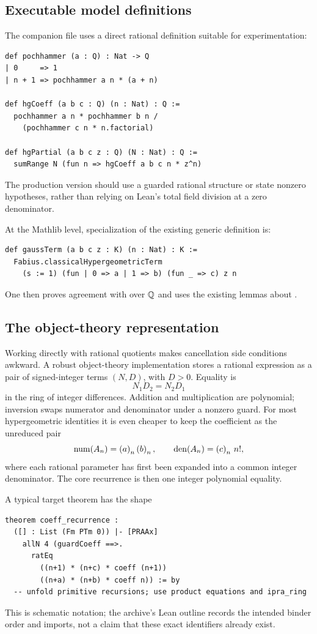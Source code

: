 \subsection{Executable model definitions}

The companion file  uses a direct
rational definition suitable for experimentation:
\begin{lstlisting}[language={}]
def pochhammer (a : Q) : Nat -> Q
| 0     => 1
| n + 1 => pochhammer a n * (a + n)

def hgCoeff (a b c : Q) (n : Nat) : Q :=
  pochhammer a n * pochhammer b n /
    (pochhammer c n * n.factorial)

def hgPartial (a b c z : Q) (N : Nat) : Q :=
  sumRange N (fun n => hgCoeff a b c n * z^n)
\end{lstlisting}
The production version should use a guarded rational structure or state
nonzero hypotheses, rather than relying on Lean's total field division at a
zero denominator.

At the Mathlib level, specialization of the existing generic definition is:
\begin{lstlisting}[language={}]
def gaussTerm (a b c z : K) (n : Nat) : K :=
  Fabius.classicalHypergeometricTerm
    (s := 1) (fun | 0 => a | 1 => b) (fun _ => c) z n
\end{lstlisting}
One then proves agreement with  over \(\mathbb Q\) and uses the
existing lemmas about .

\subsection{The object-theory representation}

Working directly with rational quotients makes cancellation side conditions
awkward.  A robust object-theory implementation stores a rational expression
as a pair of signed-integer terms \((N,D)\), with \(D>0\).  Equality is
\[
  N_1D_2=N_2D_1
\]
in the ring of integer differences.  Addition and multiplication are
polynomial; inversion swaps numerator and denominator under a nonzero guard.
For most hypergeometric identities it is even cheaper to keep the coefficient
as the unreduced pair
\[
 \operatorname{num}(A_n)=\left(a\right)_{n}\left(b\right)_{n},
 \qquad
 \operatorname{den}(A_n)=\left(c\right)_{n}\,n!,
\]
where each rational parameter has first been expanded into a common integer
denominator.  The core recurrence is then one integer polynomial equality.

A typical target theorem has the shape
\begin{lstlisting}[language={}]
theorem coeff_recurrence :
  ([] : List (Fm PTm 0)) |- [PRAAx]
    allN 4 (guardCoeff ==>.
      ratEq
        ((n+1) * (n+c) * coeff (n+1))
        ((n+a) * (n+b) * coeff n)) := by
  -- unfold primitive recursions; use product equations and ipra_ring
\end{lstlisting}
This is schematic notation; the archive's Lean outline records the intended
binder order and imports, not a claim that these exact identifiers already
exist.

